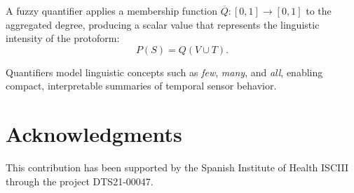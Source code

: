 \documentclass[preprint,12pt]{elsarticle}
\begin{document}
A fuzzy quantifier applies a membership function $\overline{Q}: [0,1] \rightarrow [0,1]$ to the aggregated degree, producing a scalar value that represents the linguistic intensity of the protoform:
\begin{equation}
P(S) = Q\!\left( V \cup T \right).
\end{equation}

Quantifiers model linguistic concepts such as \textit{few}, \textit{many}, and \textit{all}, enabling compact, interpretable summaries of temporal sensor behavior.

\section*{Acknowledgments}
This contribution has been supported by the Spanish Institute of Health ISCIII through the project DTS21-00047.




\end{document}
